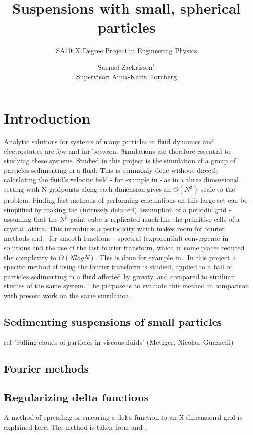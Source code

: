 \documentclass[a4paper,twoside=false,abstract=false,numbers=noenddot,
titlepage=false,headings=small,parskip=half,version=last]{scrartcl}
\title{Suspensions with small, spherical particles}
\subtitle{SA104X Degree Project in Engineering Physics}
\author[2]{Samuel Zackrisson$^1$ \\ \footnotesize Supervisor: Anna-Karin Tornberg}
\affil[1,2]{Department for Numerical Analysis, Royal Institute of Technology}
\affil[1]{samuelz@kth.se}
\affil[2]{akto@kth.se}
\begin{document}
\maketitle
\thispagestyle{empty}

\tableofcontents

\section{Introduction}
Analytic solutions for systems of many particles in fluid dynamics and electrostatics are few and far-between. Simulations are therefore essential to studying these systems. Studied in this project is the simulation of a group of particles sedimenting in a fluid. This is commonly done without directly calculating the fluid's velocity field - for example in \cite{fallingclouds} - as in a three dimensional setting with N gridpoints along each dimension gives an $O(N^3)$ scale to the problem. Finding fast methods of performing calculations on this large set can be simplified by making the (intensely debated) assumption of a periodic grid - assuming that the N$^3$-point cube is replicated much like the primitive cells of a crystal lattice. This introduces a periodicity which makes room for fourier methods and - for smooth functions - spectral (exponential) convergence in solutions and the use of the fast fourier transform, which in some places reduced the complexity to $O(NlogN)$. This is done for example in \cite{fluctuatesediment}. In this project a specific method of using the fourier transform is studied, applied to a ball of particles sedimenting in a fluid affected by gravity, and compared to similuar studies of the same system. The purpose is to evaluate this method in comparison with present work on the same simulation.
\subsection{Sedimenting suspensions of small particles}
ref "Falling clouds of particles in viscous fluids" (Metzger, Nicolas, Guazzelli)
\subsection{Fourier methods}
\subsection{Regularizing delta functions}
A method of spreading or smearing a delta function to an N-dimensional grid is explained here. The method is taken from \cite{spectralewald} and \cite{interfaceregularization}.
\end{document}
